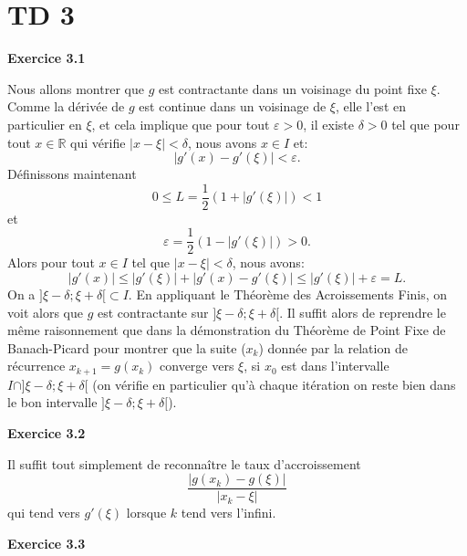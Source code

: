 \documentclass{article}
\begin{document}
\newpage

\section{TD 3}

{\bf Exercice 3.1}

Nous allons montrer que $g$ est contractante dans un voisinage du point fixe $\xi$. Comme la dérivée de $g$ est continue dans un voisinage de $\xi$, elle l'est en particulier en $\xi$, et cela implique que pour tout $\varepsilon > 0$, il existe $\delta > 0$ tel que pour tout $x\in \mathbb{R}$ qui vérifie $|x - \xi| < \delta$, nous avons $x\in I$ et:
\[
| g'(x) - g'(\xi) | < \varepsilon. 
\]
Définissons maintenant
\[
0 \leq L = \frac12 ( 1 + |g'(\xi)| ) < 1
\]
et
\[
\varepsilon = \frac12 ( 1 - |g'(\xi)| ) > 0.
\]
Alors pour tout $x \in I$ tel que $|x - \xi| < \delta$, nous avons:
\[
|g'(x)| \leq |g'(\xi)| + |g'(x) - g'(\xi)| 
\leq |g'(\xi)| + \varepsilon = L.
\]
On a $]\xi - \delta ; \xi + \delta [ \subset I$.
En appliquant le Théorème des Acroissements Finis, on voit alors que $g$ est contractante sur $]\xi - \delta ; \xi + \delta [$. Il suffit alors de reprendre le même raisonnement que dans la démonstration du Théorème de Point Fixe de Banach-Picard pour montrer que la suite ($x_k$) donnée par la relation de récurrence $x_{k+1} = g(x_k)$ converge vers $\xi$, si $x_0$ est dans l'intervalle $I \cap ]\xi - \delta ; \xi + \delta [$ (on vérifie en particulier qu'à chaque itération on reste bien dans le bon intervalle $]\xi - \delta ; \xi + \delta [$).

\medskip

{\bf Exercice 3.2}

Il suffit tout simplement de reconnaître le taux d'accroissement
\[
\frac{|g(x_k)-g(\xi)|}{|x_k - \xi|}
\]
qui tend vers $g'(\xi)$ lorsque $k$ tend vers l'infini.

\medskip

{\bf Exercice 3.3}
\end{document}
